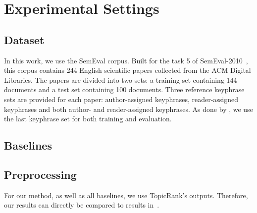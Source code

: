 \section{Experimental Settings}
\label{sec:experimental_settings}
  \subsection{Dataset}
  \label{subsec:dataset}
    In this work, we use the SemEval corpus. Built for the task 5 of
    SemEval-2010~\cite{kim2010semeval}, this corpus contains 244 English
    scientific papers collected from the ACM Digital Libraries. The papers are
    divided into two sets: a training set containing 144 documents and a test
    set containing 100 documents. Three reference keyphrase sets are provided
    for each paper: author-assigned keyphrases, reader-assigned keyphrases and
    both author- and reader-assigned keyphrases. As done by
    , we use the last keyphrase set for both
    training and evaluation.

  \subsection{Baselines}
  \label{subsec:baselines}

  \subsection{Preprocessing}
  \label{subsec:preprocessing}
    For our method, as well as all baselines, we use Topic\-Rank's outputs.
    Therefore, our results can directly be compared to results
    in~\cite{bougouin2013topicrank}.

